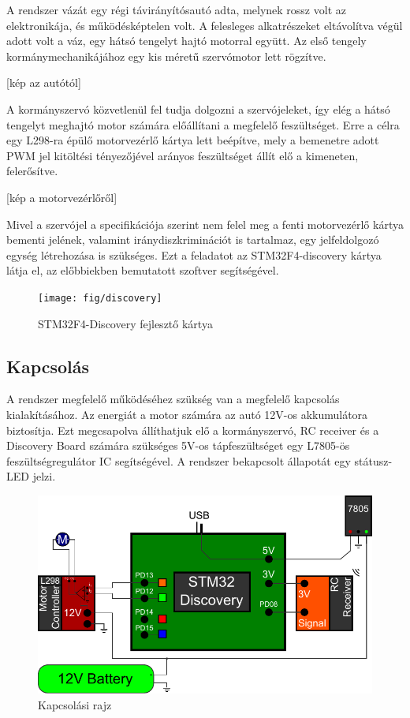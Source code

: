 A rendszer vázát egy régi távirányítósautó adta, melynek rossz volt az elektronikája, és működésképtelen volt. A felesleges alkatrészeket eltávolítva végül adott volt a váz, egy hátsó tengelyt hajtó motorral együtt. Az első tengely kormánymechanikájához egy kis méretű szervómotor lett rögzítve.

[kép az autótól]

A kormányszervó közvetlenül fel tudja dolgozni a szervójeleket, így elég a hátsó tengelyt meghajtó motor számára előállítani a megfelelő feszültséget. Erre a célra egy L298-ra épülő motorvezérlő kártya lett beépítve, mely a bemenetre adott PWM jel kitöltési tényezőjével arányos feszültséget állít elő a kimeneten, felerősítve.

[kép a motorvezérlőről]

Mivel a szervójel a specifikációja szerint nem felel meg a fenti motorvezérlő kártya bementi jelének, valamint iránydiszkriminációt is tartalmaz, egy jelfeldolgozó egység létrehozása is szükséges. Ezt a feladatot az STM32F4-discovery kártya látja el, az előbbiekben bemutatott szoftver segítségével.

\begin{figure}[H]
	\centering
	\texttt{[image: fig/discovery]}
	\caption{STM32F4-Discovery fejlesztő kártya}
	\label{fig:discovery}
\end{figure}

\subsection{Kapcsolás}

A rendszer megfelelő működéséhez szükség van a megfelelő kapcsolás kialakításához. Az energiát a motor számára az autó 12V-os akkumulátora biztosítja. Ezt megcsapolva állíthatjuk elő a kormányszervó, RC receiver és a Discovery Board számára szükséges 5V-os tápfeszültséget egy L7805-ös feszültségregulátor IC \cite{L7805} segítségével. A rendszer bekapcsolt állapotát egy státusz-LED jelzi.

\begin{figure}[H]
	\centering
	\includegraphics[width=\textwidth]{fig/circuitry}
	\caption{Kapcsolási rajz}
	\label{fig:circuitry}
\end{figure}


